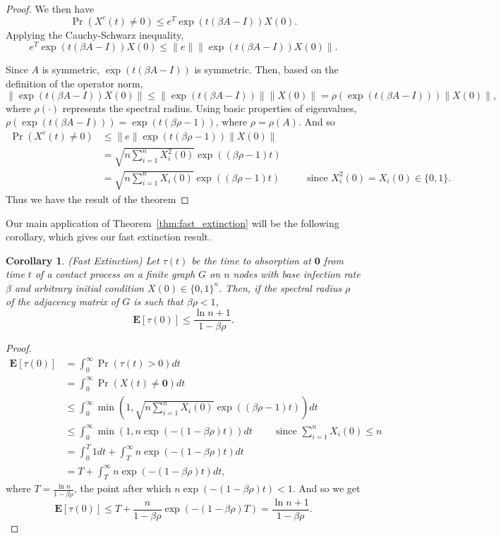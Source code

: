 \documentclass[11pt]{article}
\newtheorem{corollary}{Corollary}[theorem]
\begin{document}
\begin{proof}
We then have
$$\Pr(X^c(t)\neq 0) \leq e^T \exp(t(\beta A - I))X(0).$$
Applying the Cauchy-Schwarz inequality,
$$e^T \exp(t(\beta A - I))X(0) \leq \|e\| \| \exp(t(\beta A - I))X(0) \|.$$

Since $A$ is symmetric, $\exp(t(\beta A - I))$ is symmetric. Then, based on the definition of the operator norm,
$$\| \exp(t(\beta A - I))X(0) \| \leq \| \exp(t(\beta A - I)) \| \|X(0)\| = \rho(\exp(t(\beta A - I))) \|X(0)\|,$$
where $\rho(\cdot)$ represents the spectral radius. Using basic properties of eigenvalues, $\rho(\exp(t(\beta A - I))) = \exp(t(\beta \rho - 1))$, where $\rho = \rho(A)$. And so
$$\begin{aligned}
\Pr(X^c(t) \neq 0) &\leq \|e\| \exp(t(\beta \rho - 1)) \|X(0)\| \\
	&= \sqrt{n \sum_{i=1}^n X_i^2(0)} \exp((\beta \rho - 1)t) \\
	&= \sqrt{n \sum_{i=1}^n X_i(0)} \exp((\beta \rho - 1)t) \hspace{1cm} \text{ since } X_i^2(0) = X_i(0)\in \{0,1\}.
\end{aligned}$$
Thus we have the result of the theorem
\end{proof}

Our main application of Theorem~\ref{thm:fast_extinction} will be the following corollary, which gives our fast extinction result.

\begin{corollary}
(Fast Extinction) Let $\tau(t)$ be the time to absorption at $\mathbf{0}$ from time $t$ of a contact process on a finite graph $G$ on $n$ nodes with base infection rate $\beta$ and arbitrary initial condition $X(0)\in \{0,1\}^n$. Then, if the spectral radius $\rho$ of the adjacency matrix of $G$ is such that $\beta \rho < 1$,
$$\mathbf{E}[\tau(0)] \leq \frac{\ln n + 1}{1-\beta \rho}.$$
\end{corollary}

\begin{proof}
$$\begin{aligned}
\mathbf{E}[\tau(0)] &= \int_0^\infty \Pr(\tau(t) > 0) dt \\
	&= \int_0^\infty \Pr(X(t) \neq \mathbf{0})dt \\
	&\leq \int_0^\infty \min \left(1, \sqrt{n \sum_{i=1}^n X_i(0)} \exp((\beta \rho - 1)t) \right) dt \\
	&\leq \int_0^\infty \min \left(1, n \exp(-(1- \beta \rho)t) \right) dt \hspace{1cm} \text{since } \sum_{i=1}^n X_i(0) \leq n \\
	&= \int_0^T 1 dt + \int_T^\infty n \exp(-(1- \beta \rho)t) dt \\
	&= T + \int_T^\infty n \exp(-(1- \beta \rho)t) dt,
\end{aligned}$$
where $T = \frac{\ln n}{1-\beta \rho}$, the point after which $n \exp(-(1- \beta \rho)t) < 1$. And so we get
$$\mathbf{E}[\tau(0)] \leq T + \frac{n}{1-\beta \rho} \exp(-(1-\beta \rho)T) = \frac{\ln n + 1}{1-\beta \rho}.$$
\end{proof}
\end{document}

